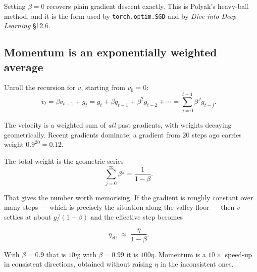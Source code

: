 \documentclass[11pt]{article}
\begin{document}
Setting $\beta = 0$ recovers plain gradient descent exactly. This is Polyak's
heavy-ball method, and it is the form used by \texttt{torch.optim.SGD} and by
\emph{Dive into Deep Learning} \S12.6.

\subsection{Momentum is an exponentially weighted average}

Unroll the recursion for $v$, starting from $v_0 = 0$:
\[
  v_t = \beta v_{t-1} + g_t
      = g_t + \beta g_{t-1} + \beta^2 g_{t-2} + \cdots
      = \sum_{j=0}^{t-1} \beta^{\,j} g_{t-j}.
\]

The velocity is a weighted sum of \emph{all} past gradients, with weights
decaying geometrically. Recent gradients dominate; a gradient from $20$ steps
ago carries weight $0.9^{20} = 0.12$.

The total weight is the geometric series
\[
  \sum_{j=0}^{\infty} \beta^{\,j} = \frac{1}{1-\beta}.
\]

That gives the number worth memorising. If the gradient is roughly constant
over many steps --- which is precisely the situation along the valley floor ---
then $v$ settles at about $g/(1-\beta)$ and the effective step becomes

\begin{equation}
  \label{eq:effstep}
  \eta_{\text{eff}} \;\approx\; \frac{\eta}{1-\beta}.
\end{equation}

With $\beta = 0.9$ that is $10\eta$; with $\beta = 0.99$ it is $100\eta$.
Momentum is a $10\times$ speed-up in consistent directions, obtained without
raising $\eta$ in the inconsistent ones.
\end{document}
